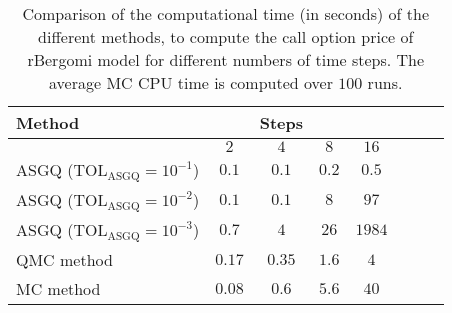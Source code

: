 \FloatBarrier
\begin{table}[h!]
	\centering
	\begin{tabular}{l*{6}{c}r}
		\toprule[1.5pt]
		Method & & Steps  & &     \\
		\hline	
		& $2$ & $4$ & $8$ & $16$ &   \\
		\hline
		ASGQ ($\text{TOL}_{\text{ASGQ}}=10^{-1}$)  & $0.1$ & $0.1$ & $0.2$ & $0.5$ \\
		ASGQ ($\text{TOL}_{\text{ASGQ}}=10^{-2}$)  & $0.1$ & $0.1$ & $8$ & $97$ \\
		ASGQ ($\text{TOL}_{\text{ASGQ}}=10^{-3}$)  & $0.7$ & $4$ & $26$ & $1984$ \\
		\hline
		QMC method    & $ 0.17 $  & $  0.35$  & $ 1.6$ & $ 4$  \\	
		MC method   & $ 0.08 $  & $  0.6$  & $ 5.6$ & $ 40$  \\	
		\bottomrule[1.25pt]
	\end{tabular}
	\caption{Comparison of the computational time (in seconds) of the different methods, to compute the call option price of rBergomi model for different numbers of time steps. The average  MC CPU time is computed over $100$ runs. }
	\label{Comparsion of the computational time of  MC and MISC, used to compute Call option price of rBergomi model for different number of time steps. Case set5}
\end{table}

\FloatBarrier

